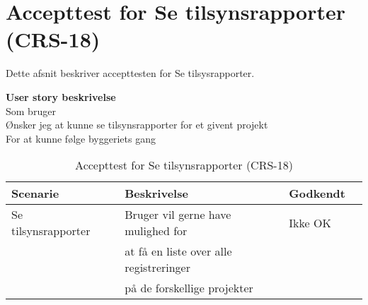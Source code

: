 \section{Accepttest for Se tilsynsrapporter (CRS-18)}
Dette afsnit beskriver accepttesten for Se tilsysrapporter.

\textbf{User story beskrivelse} \\
Som bruger \\
Ønsker jeg at kunne se tilsynsrapporter for et givent projekt \\
For at kunne følge byggeriets gang

\begin{table}[H]
	\centering
	\begin{tabular}{|ll|l|ll|} \hline
		\textbf{Scenarie} &  & \textbf{Beskrivelse}&  \textbf{Godkendt}&  \\ \hline
		Se tilsynsrapporter&  &  Bruger vil gerne have mulighed for &  Ikke OK&  \\
		& & at få en liste over alle registreringer & & \\
		& & på de forskellige projekter& & \\ \hline
	\end{tabular}
	\caption{Accepttest for Se tilsynsrapporter (CRS-18)}
	\label{AcceptTilsyn}
\end{table}